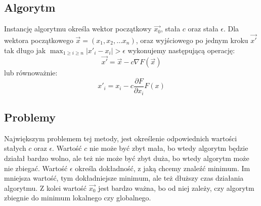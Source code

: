 \documentclass{../notatki}
\begin{document}
\subsection{Algorytm}

Instancję algorytmu określa wektor początkowy $\vec{x_0}$, stała $c$ oraz stała
$\epsilon$.
Dla wektora początkowego $\vec{x} = (x_1, x_2, \dots x_n)$, oraz wyjściowego
po jednym kroku $\vec{x'}$ tak długo jak $\max_{1 \ge i \ge n}|x'_i -
x_i| > \epsilon$ wykonujemy następującą operację:
$$
\vec{x'} = \vec{x} - c \nabla F(\vec{x})
$$
lub równoważnie:
$$
x'_i = x_i - c \frac{\partial F}{\partial x_i}F(x)
$$

\subsection{Problemy}

Największym problemem tej metody, jest określenie odpowiednich wartości stałych
$c$ oraz $\epsilon$. Wartość $c$ nie może być zbyt mała, bo wtedy algorytm
będzie działał bardzo wolno, ale też nie może być zbyt duża, bo wtedy algorytm
może nie zbiegać. Wartość $\epsilon$ określa dokładność, z jaką chcemy znaleźć
minimum. Im mniejsza wartość, tym dokładniejsze minimum, ale też dłuższy czas
działania algorytmu. Z kolei wartość $\vec{x_0}$ jest bardzo ważna, bo od niej
zależy, czy algorytm zbiegnie do minimum lokalnego czy globalnego.
\end{document}
